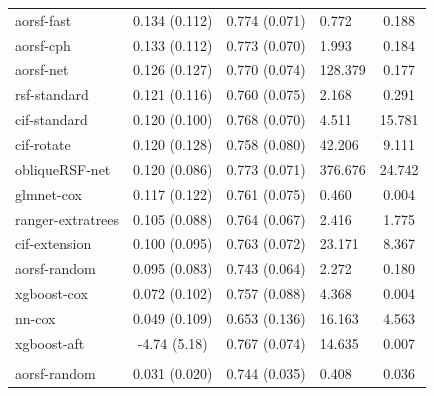 \documentclass[twoside,11pt]{article}\usepackage[]{graphicx}\usepackage[]{xcolor}
\newenvironment{knitrout}{}{} %
\begin{document}
\begin{knitrout}
\begin{longtable}[t]{lcclc}
\endfoot
\bottomrule
\endlastfoot
\addlinespace[0.3em]
\hline
\multicolumn{5}{l}{\textit{\textbf{Overall}}}\\
\hline
\hspace{1em}aorsf-fast & 0.134 (0.112) & 0.774 (0.071) & 0.772 & 0.188\\
\hspace{1em}aorsf-cph & 0.133 (0.112) & 0.773 (0.070) & 1.993 & 0.184\\
\hspace{1em}aorsf-net & 0.126 (0.127) & 0.770 (0.074) & 128.379 & 0.177\\
\hspace{1em}rsf-standard & 0.121 (0.116) & 0.760 (0.075) & 2.168 & 0.291\\
\hspace{1em}cif-standard & 0.120 (0.100) & 0.768 (0.070) & 4.511 & 15.781\\
\hspace{1em}cif-rotate & 0.120 (0.128) & 0.758 (0.080) & 42.206 & 9.111\\
\hspace{1em}obliqueRSF-net & 0.120 (0.086) & 0.773 (0.071) & 376.676 & 24.742\\
\hspace{1em}glmnet-cox & 0.117 (0.122) & 0.761 (0.075) & 0.460 & 0.004\\
\hspace{1em}ranger-extratrees & 0.105 (0.088) & 0.764 (0.067) & 2.416 & 1.775\\
\hspace{1em}cif-extension & 0.100 (0.095) & 0.763 (0.072) & 23.171 & 8.367\\
\hspace{1em}aorsf-random & 0.095 (0.083) & 0.743 (0.064) & 2.272 & 0.180\\
\hspace{1em}xgboost-cox & 0.072 (0.102) & 0.757 (0.088) & 4.368 & 0.004\\
\hspace{1em}nn-cox & 0.049 (0.109) & 0.653 (0.136) & 16.163 & 4.563\\
\hspace{1em}xgboost-aft & -4.74 (5.18) & 0.767 (0.074) & 14.635 & 0.007\\
\addlinespace[0.3em]
\hline
\multicolumn{5}{l}{\textit{\textbf{ACTG 320; AIDS diagnosis, n = 1151, p = 12}}}\\
\hline
\hspace{1em}aorsf-random & 0.031 (0.020) & 0.744 (0.035) & 0.408 & 0.036\\

\end{longtable}
\end{knitrout}
\end{document}
